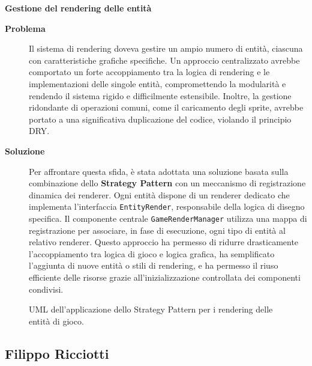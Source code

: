 \documentclass[a4paper,12pt]{report}
\begin{document}
\noindent
\textbf{Gestione del rendering delle entità}
\begin{description}
	\item[\textbf{Problema}]
	      Il sistema di rendering doveva gestire un ampio numero di entità, ciascuna con caratteristiche grafiche specifiche. Un approccio centralizzato avrebbe comportato un forte accoppiamento tra la logica di rendering e
	      le implementazioni delle singole entità, compromettendo la modularità e rendendo il sistema rigido e difficilmente estensibile. Inoltre, la gestione ridondante di operazioni comuni, come il caricamento degli sprite, avrebbe
	      portato a una significativa duplicazione del codice, violando il principio DRY.

	\item[\textbf{Soluzione}]
	      Per affrontare questa sfida, è stata adottata una soluzione basata sulla combinazione dello \textbf{Strategy Pattern} con un meccanismo di registrazione dinamica dei renderer. Ogni entità dispone di un renderer dedicato che implementa l'interfaccia \texttt{EntityRender},
	      responsabile della logica di disegno specifica. Il componente centrale \texttt{GameRenderManager} utilizza una mappa di registrazione per associare, in fase di esecuzione, ogni tipo di entità al relativo renderer.
	      Questo approccio ha permesso di ridurre drasticamente l'accoppiamento tra logica di gioco e logica grafica, ha semplificato l'aggiunta di nuove entità o stili di rendering, e ha permesso il riuso efficiente delle risorse grazie all'inizializzazione controllata dei componenti condivisi.
\end{description}
\begin{figure}[H]
	\centering{}
	
	\caption{UML dell'applicazione dello Strategy Pattern per i rendering delle entità di gioco.}
	\label{img:GameRenderManager}
\end{figure}

\newpage
\subsection{Filippo Ricciotti}
\end{document}
